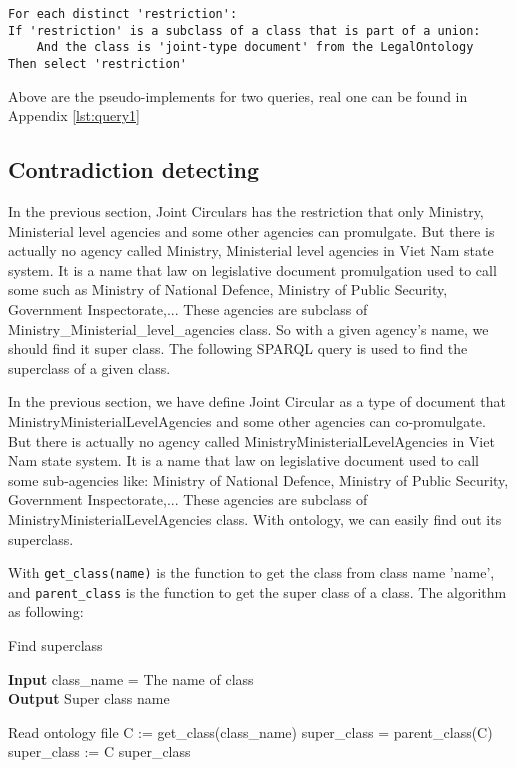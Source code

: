 \begin{lstlisting}
For each distinct 'restriction':
If 'restriction' is a subclass of a class that is part of a union:
    And the class is 'joint-type document' from the LegalOntology
Then select 'restriction'
\end{lstlisting}

Above are the pseudo-implements for two queries, real one can be found in Appendix \ref{lst:query1}

\subsection{Contradiction detecting}

In the previous section, Joint Circulars has the restriction that only Ministry, Ministerial level agencies and some other agencies can promulgate. But there is actually no agency called Ministry, Ministerial level agencies in Viet Nam state system. It is a name that law on legislative document promulgation used to call some such as Ministry of National Defence, Ministry of Public Security, Government Inspectorate,... These agencies are subclass of Ministry_Ministerial_level_agencies class. So with a given agency's name, we should find it super class. The following SPARQL query is used to find the superclass of a given class.

In the previous section, we have define Joint Circular as a type of document that MinistryMinisterialLevelAgencies and some other agencies can co-promulgate. But there is actually no agency called MinistryMinisterialLevelAgencies in Viet Nam state system. It is a name that law on legislative document used to call some sub-agencies like: Ministry of National Defence, Ministry of Public Security, Government Inspectorate,... These agencies are subclass of MinistryMinisterialLevelAgencies class. With ontology, we can easily find out its superclass.

With \texttt{get\_class(name)} is the function to get the class from class name 'name', and \texttt{parent\_class} is the function to get the super class of a class. The algorithm as following:

\begin{algorithm}[H]
\caption{Find superclass}\label{alg:superclass}
\hspace*{\algorithmicindent} \textbf{Input} class\_name = The name of class\\
\hspace*{\algorithmicindent} \textbf{Output} Super class name
\begin{algorithmic}[1]
\State Read ontology file
\State C := get\_class(class\_name)
\State super\_class = parent\_class(C)
\Else
{}
\State super\_class := C
\EndIf
\EndIf
\State \Return super\_class
\end{algorithmic}
\end{algorithm}

